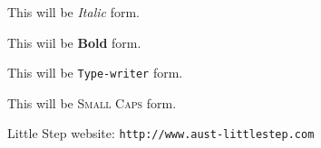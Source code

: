 \documentclass[11pt]{article}
\begin{document}
This will be \textit{Italic} form.

This wiil be \textbf{Bold} form.

This will be \texttt{Type-writer} form.

This will be \textsc{Small Caps} form.

Little Step website: \texttt{http://www.aust-littlestep.com}
\end{document}
